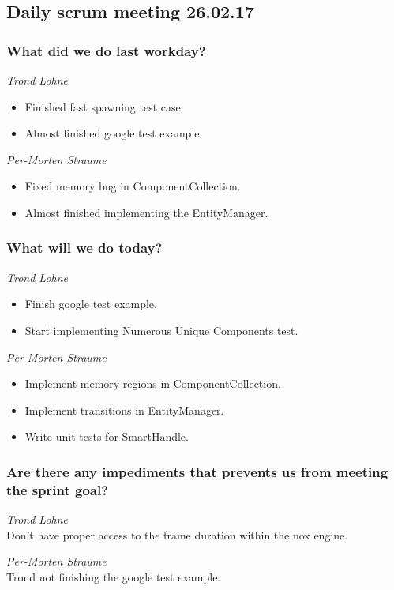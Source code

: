 \documentclass{article}
\begin{document}
\begin{center}
\subsection*{Daily scrum meeting 26.02.17}
\end{center}
\bigskip


\subsubsection*{What did we do last workday?}

\noindent\textit{Trond Lohne}
\begin{itemize}
	\item 
    Finished fast spawning test case.
	
	\item 
	Almost finished google test example.
\end{itemize}

\medskip

\noindent\textit{Per-Morten Straume}
\begin{itemize}
	\item 
    Fixed memory bug in ComponentCollection.
	
	\item 
	Almost finished implementing the EntityManager.
\end{itemize}


\subsubsection*{What will we do today?}

\noindent\textit{Trond Lohne}
\begin{itemize}
	\item 
	Finish google test example.
	
	\item 
	Start implementing Numerous Unique Components test.	
\end{itemize}

\medskip

\noindent\textit{Per-Morten Straume}
\begin{itemize}
	\item 
	Implement memory regions in ComponentCollection.
	
	\item 
	Implement transitions in EntityManager.
	
	\item
    Write unit tests for SmartHandle.
\end{itemize}


\subsubsection*{Are there any impediments that prevents us from meeting the sprint goal?}

\noindent\textit{Trond Lohne}\\
Don't have proper access to the frame duration
within the nox engine.

\medskip

\noindent\textit{Per-Morten Straume}\\
Trond not finishing the google test example.
\end{document}
